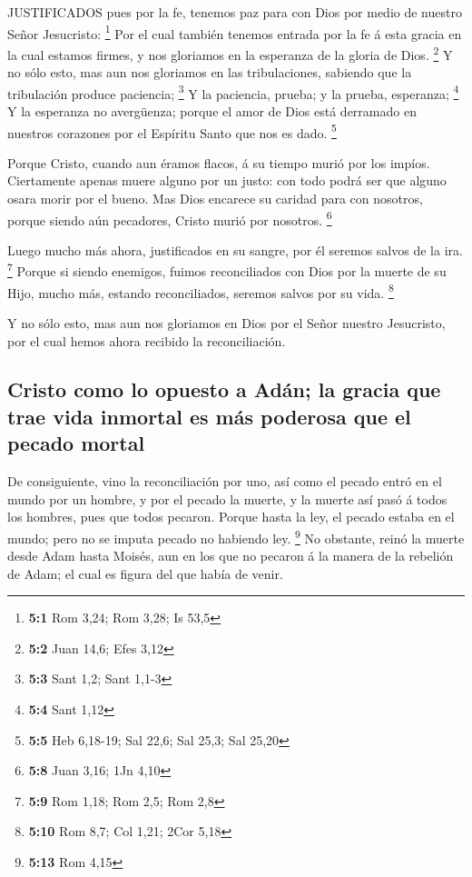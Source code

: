  JUSTIFICADOS pues por la fe, tenemos paz para con Dios por
medio de nuestro Señor Jesucristo: \footnote{\textbf{5:1} Rom 3,24; Rom
  3,28; Is 53,5}  Por el cual también tenemos entrada por la
fe á esta gracia en la cual estamos firmes, y nos gloriamos en la
esperanza de la gloria de Dios. \footnote{\textbf{5:2} Juan 14,6; Efes
  3,12}  Y no sólo esto, mas aun nos gloriamos en las
tribulaciones, sabiendo que la tribulación produce paciencia;
\footnote{\textbf{5:3} Sant 1,2; Sant 1,1-3}  Y la
paciencia, prueba; y la prueba, esperanza; \footnote{\textbf{5:4} Sant
  1,12}  Y la esperanza no avergüenza; porque el amor de
Dios está derramado en nuestros corazones por el Espíritu Santo que nos
es dado. \footnote{\textbf{5:5} Heb 6,18-19; Sal 22,6; Sal 25,3; Sal
  25,20}

 Porque Cristo, cuando aun éramos flacos, á su tiempo murió
por los impíos.  Ciertamente apenas muere alguno por un
justo: con todo podrá ser que alguno osara morir por el bueno.
 Mas Dios encarece su caridad para con nosotros, porque
siendo aún pecadores, Cristo murió por nosotros. \footnote{\textbf{5:8}
  Juan 3,16; 1Jn 4,10}

 Luego mucho más ahora, justificados en su sangre, por él
seremos salvos de la ira. \footnote{\textbf{5:9} Rom 1,18; Rom 2,5; Rom
  2,8}  Porque si siendo enemigos, fuimos reconciliados con
Dios por la muerte de su Hijo, mucho más, estando reconciliados, seremos
salvos por su vida. \footnote{\textbf{5:10} Rom 8,7; Col 1,21; 2Cor 5,18}

 Y no sólo esto, mas aun nos gloriamos en Dios por el Señor
nuestro Jesucristo, por el cual hemos ahora recibido la reconciliación.

\hypertarget{cristo-como-lo-opuesto-a-aduxe1n-la-gracia-que-trae-vida-inmortal-es-muxe1s-poderosa-que-el-pecado-mortal}{%
\subsection{Cristo como lo opuesto a Adán; la gracia que trae vida
inmortal es más poderosa que el pecado
mortal}\label{cristo-como-lo-opuesto-a-aduxe1n-la-gracia-que-trae-vida-inmortal-es-muxe1s-poderosa-que-el-pecado-mortal}}

 De consiguiente, vino la reconciliación por uno, así como
el pecado entró en el mundo por un hombre, y por el pecado la muerte, y
la muerte así pasó á todos los hombres, pues que todos pecaron.
 Porque hasta la ley, el pecado estaba en el mundo; pero no
se imputa pecado no habiendo ley. \footnote{\textbf{5:13} Rom 4,15}
 No obstante, reinó la muerte desde Adam hasta Moisés, aun
en los que no pecaron á la manera de la rebelión de Adam; el cual es
figura del que había de venir.

